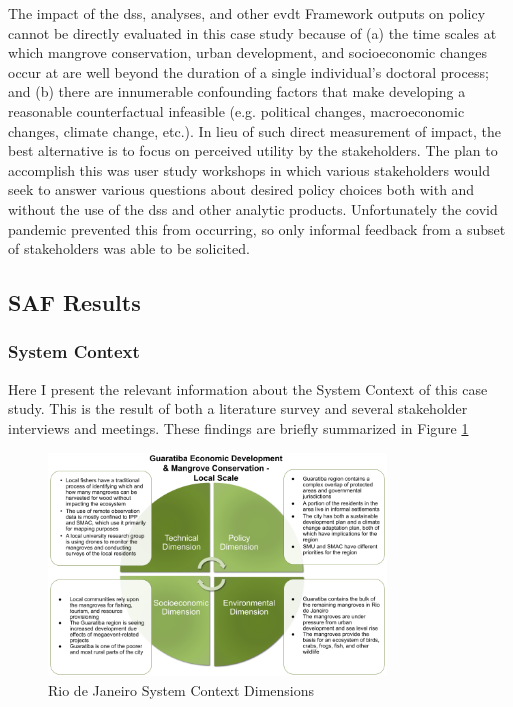 The impact of the \ac{dss}, analyses, and other \ac{evdt} Framework outputs on policy cannot be directly evaluated in this case study because of (a) the time scales at which mangrove conservation, urban development, and socioeconomic changes occur at are well beyond the duration of a single individual's doctoral process; and (b) there are innumerable confounding factors that make developing a reasonable counterfactual infeasible (e.g. political changes, macroeconomic changes, climate change, etc.). In lieu of such direct measurement of impact, the best alternative is to focus on perceived utility by the stakeholders. The plan to accomplish this was user study workshops in which various stakeholders would seek to answer various questions about desired policy choices both with and without the use of the \ac{dss} and other analytic products. Unfortunately the \ac{covid} pandemic prevented this from occurring, so only informal feedback from a subset of stakeholders was able to be solicited.


\subsection{SAF Results} \label{sec:rio-saf-results}

\subsubsection{System Context}

Here I present the relevant information about the System Context of this case study. This is the result of both a literature survey and several stakeholder interviews and meetings. These findings are briefly summarized in Figure \ref{fig:dimensions_rio}

\begin{figure}[H] 
\centering
\includegraphics[width=0.8\textwidth]{Figures/chap4/dimensions_rio.png}
\caption[Rio de Janeiro System Context Dimensions]{Rio de Janeiro System Context Dimensions}
\label{fig:dimensions_rio}
\end{figure}

